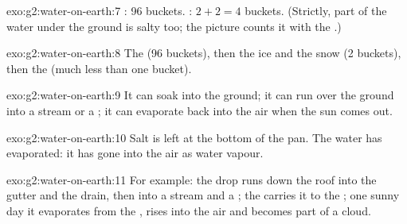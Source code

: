 \begin{solution}{exo:g2:water-on-earth:7}
: 96 buckets. : $2 + 2 = 4$ buckets.
(Strictly, part of the water under the ground is salty too; the picture
counts it with the .)
\end{solution}

\begin{solution}{exo:g2:water-on-earth:8}
The  (96 buckets), then the ice and the snow (2 buckets), then the
 (much less than one bucket).
\end{solution}

\begin{solution}{exo:g2:water-on-earth:9}
It can soak into the ground; it can run over the ground into a stream or
a ; it can evaporate back into the air when the sun comes out.
\end{solution}

\begin{solution}{exo:g2:water-on-earth:10}
Salt is left at the bottom of the pan. The water has evaporated: it has
gone into the air as water vapour.
\end{solution}

\begin{solution}{exo:g2:water-on-earth:11}
For example: the drop runs down the roof into the gutter and the drain,
then into a stream and a ; the  carries it to the ; one sunny
day it evaporates from the , rises into the air and becomes part of a
cloud.
\end{solution}
